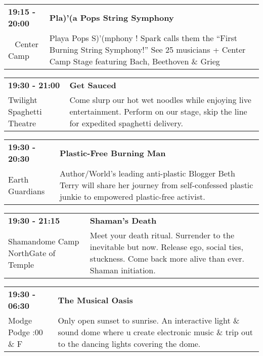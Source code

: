 \begin{tabular}{ p{1in} p{2.2in} }
    \textbf{19:15 - 20:00} & \textbf{Pla)'(a Pops String Symphony} \\
    ~ \newline Center Camp & Playa Pops S)'(mphony ! Spark calls them the ``First Burning String Symphony!'' See 25 musicians + Center Camp Stage featuring Bach, Beethoven \& Grieg \\
    \hline 
\end{tabular}
    
\begin{tabular}{ p{1in} p{2.2in} }
    \textbf{19:30 - 21:00} & \textbf{Get Sauced} \\
    Twilight Spaghetti Theatre \newline  & Come slurp our hot wet noodles while enjoying live entertainment. Perform on our stage, skip the line for expedited spaghetti delivery. \\
    \hline 
\end{tabular}
    
\begin{tabular}{ p{1in} p{2.2in} }
    \textbf{19:30 - 20:30} & \textbf{Plastic-Free Burning Man } \\
    Earth Guardians \newline  & Author/World's leading anti-plastic Blogger Beth Terry will share her journey from self-confessed plastic junkie to empowered plastic-free activist. \\
    \hline 
\end{tabular}
    
\begin{tabular}{ p{1in} p{2.2in} }
    \textbf{19:30 - 21:15} & \textbf{Shaman's Death   } \\
    Shamandome Camp \newline NorthGate of Temple & Meet your death ritual. Surrender to the inevitable but now. Release ego, social ties, stuckness. Come back more alive than ever. Shaman initiation. \\
    \hline 
\end{tabular}
    
\begin{tabular}{ p{1in} p{2.2in} }
    \textbf{19:30 - 06:30} & \textbf{The Musical Oasis} \\
    Modge Podge \newline 9:00 \& F & Only open sunset to sunrise.  An interactive light \& sound dome where u create electronic music \& trip out to the dancing lights covering the dome. \\
    \hline 
\end{tabular}
    
